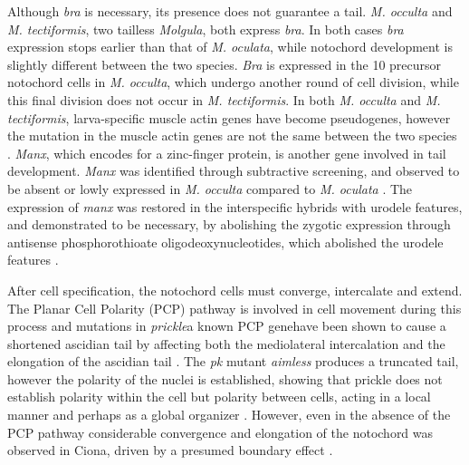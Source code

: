 Although \textit{bra} is necessary, its presence does not guarantee a tail. \textit{M. occulta} and \textit{M. tectiformis}, two tailless \textit{Molgula}, both express \textit{bra}. In both cases \textit{bra} expression stops earlier than that of \textit{M. oculata}, while notochord development is slightly different between the two species. \textit{Bra} is expressed in the 10 precursor notochord cells in \textit{M. occulta}, which undergo another round of cell division, while this final division does not occur in \textit{M. tectiformis}.  In  both \textit{M. occulta} and \textit{M. tectiformis}, larva-specific muscle actin genes have become pseudogenes, however the mutation in the muscle actin genes are not the same between the two species  \cite{swalla_novel_1993,jeffery_evolution_1999}. \textit{Manx}, which encodes for a zinc-finger protein, is another gene involved in tail development. \textit{Manx} was identified through subtractive screening, and observed to be absent or lowly expressed in \textit{M. occulta} compared to \textit{M. oculata} \cite{swalla_novel_1993}. The expression of \textit{manx} was restored in the interspecific hybrids with urodele features, and demonstrated to be necessary, by abolishing the zygotic expression through antisense phosphorothioate oligodeoxynucleotides, which abolished the urodele features \cite{swalla_requirement_1996, swalla_multigene_1999}. %
  
After cell specification, the notochord cells must converge, intercalate and extend. The Planar Cell Polarity (PCP) pathway is involved in cell movement during this process and mutations in \textit{prickle}\textemdash a known PCP gene\textemdash have been shown to cause a shortened ascidian tail by affecting both the mediolateral intercalation and the elongation of the ascidian tail \cite{jiang_ascidian_2005}. The \textit{pk} mutant \textit{aimless} produces a truncated tail, however the polarity of the nuclei is established, showing that prickle does not establish polarity within the cell but polarity between cells, acting in a local manner and perhaps as a global organizer \cite{jiang_ascidian_2005,kourakis_one-dimensional_2014}. However, even in the absence of the PCP pathway considerable convergence and elongation of the notochord was observed in Ciona, driven by a presumed boundary effect \cite{veeman_chongmague_2008}.

